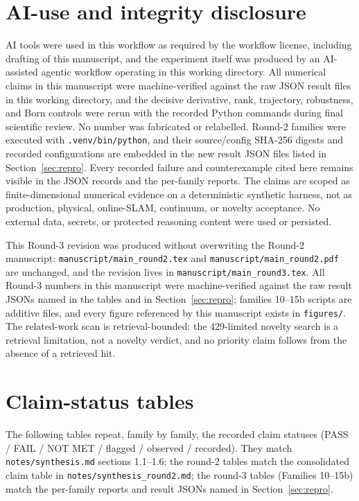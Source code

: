 \documentclass[12pt]{article}
\begin{document}
\section{AI-use and integrity disclosure}\label{sec:ai}

AI tools were used in this workflow as required by the workflow license,
including drafting of this manuscript, and the experiment itself was produced
by an AI-assisted agentic workflow operating in this working directory. All
numerical claims in this manuscript were machine-verified against the raw JSON
result files in this working directory, and the decisive derivative, rank,
trajectory, robustness, and Born controls were rerun with the recorded Python
commands during final scientific review. No number was fabricated or
relabelled. Round-2 families were executed with \texttt{.venv/bin/python},
and their source/config SHA-256 digests and recorded configurations are
embedded in the new result JSON files listed in
Section~\ref{sec:repro}. Every recorded failure and counterexample cited here remains
visible in the JSON records and the per-family reports. The claims are scoped
as finite-dimensional numerical evidence on a deterministic synthetic harness,
not as production, physical, online-SLAM, continuum, or novelty acceptance.
No external data, secrets, or protected reasoning content were used or
persisted.

This Round-3 revision was produced without overwriting the Round-2 manuscript:
\texttt{manuscript/main\_round2.tex} and \texttt{manuscript/main\_round2.pdf}
are unchanged, and the revision lives in \texttt{manuscript/main\_round3.tex}.
All Round-3 numbers in this manuscript were machine-verified against the raw
result JSONs named in the tables and in Section~\ref{sec:repro}; families
10--15b scripts are additive files, and every figure referenced by this manuscript
exists in \texttt{figures/}. The related-work scan is retrieval-bounded: the
429-limited novelty search is a retrieval limitation, not a novelty verdict,
and no priority claim follows from the absence of a retrieved hit.

\appendix
\section{Claim-status tables}\label{app:claims}

The following tables repeat, family by family, the recorded claim statuses
(PASS / FAIL / NOT MET / flagged / observed / recorded). They match
\texttt{notes/synthesis.md} sections 1.1--1.6; the round-2 tables match the
consolidated claim table in \texttt{notes/synthesis\_round2.md}; the round-3
tables (Families 10--15b) match the per-family reports and result JSONs named
in Section~\ref{sec:repro}.
\end{document}
